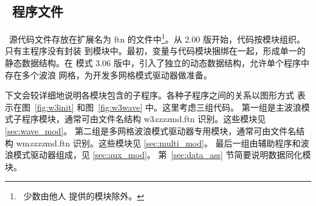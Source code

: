 \vssub
\subsection{~程序文件} \label{sec:files}
\vssub

\ws\ 源代码文件存放在扩展名为 {\file ftn} 的文件中\footnote{~少数由他人
提供的模块除外。}。从 2.00 版开始，代码按模块组织。只有主程序没有封装
到模块中。最初，变量与代码模块捆绑在一起，形成单一的静态数据结构。在
模式 3.06 版中，引入了独立的动态数据结构，允许单个程序中存在多个波浪
网格，为开发多网格模式驱动器做准备。

下文会较详细地说明各模块包含的子程序。各种子程序之间的关系以图形方式
表示在图~\ref{fig:w3init} 和图~\ref{fig:w3wave} 中。这里考虑三组代码。
第一组是主波浪模式子程序模块，通常可由文件名结构
{\file w3{\it{xxxx}}md.ftn} 识别。这些模块见 \para\ref{sec:wave_mod}。
第二组是多网格波浪模式驱动器专用模块，通常可由文件名结构
{\file wm{\it{xxxx}}md.ftn} 识别。这些模块见 \para\ref{sec:multi_mod}。
最后一组由辅助程序和波浪模式驱动器组成，见 \para\ref{sec:aux_mod}。
第~\ref{sec:data_ass} 节简要说明数据同化模块。
